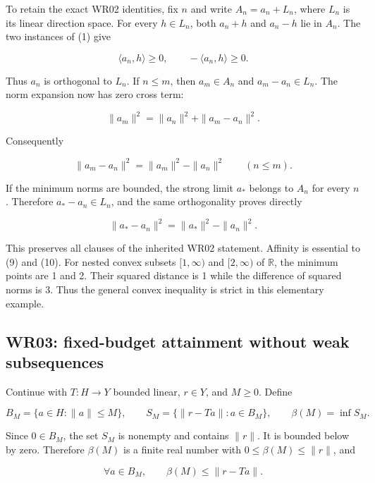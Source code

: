 \documentclass[11pt]{article}
\begin{document}
To retain the exact WR02 identities, fix \(n\) and write
\(A_n = a_n + L_n\), where \(L_n\) is its linear direction space. For
every \(h \in L_n\), both \(a_n+h\) and \(a_n-h\) lie in \(A_n\). The
two instances of (1) give

\[
\langle a_n,h\rangle\ge0,
\qquad
-\langle a_n,h\rangle\ge0.
\]

Thus \(a_n\) is orthogonal to \(L_n\). If \(n \le m\), then
\(a_m \in A_n\) and \(a_m-a_n \in L_n\). The norm expansion now has zero
cross term:

\[
\|a_m\|^2
 =\|a_n\|^2+\|a_m-a_n\|^2.
\]

Consequently

\nopagebreak[4]

\[
\|a_m-a_n\|^2=\|a_m\|^2-\|a_n\|^2\qquad(n\le m). \tag{9}
\]

If the minimum norms are bounded, the strong limit \(a_*\) belongs to
\(A_n\) for every \(n\). Therefore \(a_*-a_n \in L_n\), and the same
orthogonality proves directly

\[
\|a_*-a_n\|^2=\|a_*\|^2-\|a_n\|^2.                \tag{10}
\]

This preserves all clauses of the inherited WR02 statement. Affinity is
essential to (9) and (10). For nested convex subsets \([1,\infty)\) and
\([2,\infty)\) of \(\mathbb{R}\), the minimum points are 1 and 2. Their
squared distance is 1 while the difference of squared norms is 3. Thus
the general convex inequality is strict in this elementary example.

\hypertarget{wr03-fixed-budget-attainment-without-weak-subsequences}{%
\subsection{WR03: fixed-budget attainment without weak
subsequences}\label{wr03-fixed-budget-attainment-without-weak-subsequences}}

Continue with \(T : H \to Y\) bounded linear, \(r \in Y\), and
\(M \ge 0\). Define

\[
B_M=\{a\in H:\|a\|\le M\},\qquad
S_M=\{\|r-Ta\|:a\in B_M\},\qquad
\beta(M)=\inf S_M.                                \tag{11}
\]

Since \(0 \in B_M\), the set \(S_M\) is nonempty and contains \(\|r\|\).
It is bounded below by zero. Therefore \(\beta(M)\) is a finite real
number with \(0 \le \beta(M) \le \|r\|\), and

\[
\forall a\in B_M,\qquad \beta(M)\le\|r-Ta\|.        \tag{12}
\]
\end{document}
